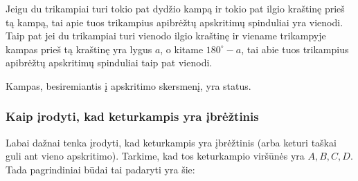 %

\begin{teig}
  Jeigu du trikampiai turi tokio pat dydžio kampą ir tokio
  pat ilgio kraštinę prieš tą kampą, tai apie tuos
  trikampius apibrėžtų apskritimų spinduliai yra vienodi.
  Taip pat jei du trikampiai turi vienodo ilgio kraštinę ir
  viename trikampyje kampas prieš tą kraštinę yra lygus $a$,
  o kitame $180^\circ - a$, tai abie tuos trikampius
  apibrėžtų apskritimų spinduliai taip pat vienodi.  
\end{teig}

\begin{teig}
  Kampas, besiremiantis į apskritimo skersmenį, yra status.
\end{teig}

\subsubsection{Kaip įrodyti, kad keturkampis yra įbrėžtinis}

Labai dažnai tenka įrodyti,
kad keturkampis yra įbrėžtinis (arba keturi taškai guli ant
vieno apskritimo). Tarkime, kad tos keturkampio viršūnės yra
$A,B,C,D$. Tada pagrindiniai būdai tai padaryti yra šie:

